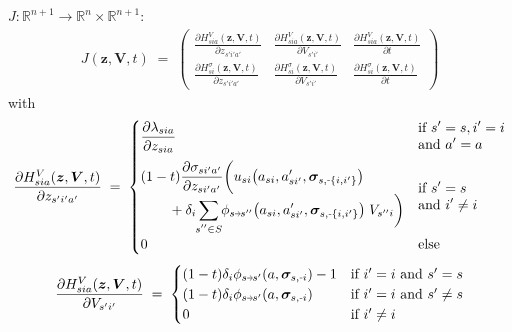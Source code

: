 \documentclass[11pt,fleqn]{article}
\newcommand{\R}{\mathbb{R}}
\newcommand{\bsigma}{\bm{\sigma}}
\newcommand{\bV}{\bm{V}}
\newcommand{\bz}{\bm{z}}
\newcommand{\shortminus}{{\text{\scalebox{0.4}[1.0]{\(-\)}}}}
\newcommand{\minusi}{\shortminus i}
\newcommand{\shortrightarrow}{\parbox{4pt}{\tikz{\draw[->](0,0)--(4pt,0);}}}
\newcommand{\phiss}{\phi_{s\shortrightarrow s'}}
\begin{document}
$J: \R^{n+1} \rightarrow \R^n \times \R^{n+1}$:
\begin{align*}
	J(\bz,\bV,t) \;=\; 
	\begin{pmatrix}
		\frac{ \partial H^V_{sia}(\bz,\bV,t) }{ \partial z_{s'i'a'} } 
		& \frac{ \partial H^V_{sia}(\bz,\bV,t) }{ \partial V_{s'i'} } 
		& \frac{ \partial H^V_{sia}(\bz,\bV,t) }{ \partial t } \\[1em] 
		\frac{ \partial H^\sigma_{si}(\bz,\bV,t) }{ \partial z_{s'i'a'} } 
		& \frac{ \partial H^\sigma_{si}(\bz,\bV,t) }{ \partial V_{s'i'} } 
		& \frac{ \partial H^\sigma_{si}(\bz,\bV,t) }{ \partial t }
	\end{pmatrix} 
\end{align*}
with
\begin{align*}
	\frac{ \partial H^V_{sia}(\bz,\bV,t) }{ \partial z_{s'i'a'} } \;=\; 
	\begin{cases}
		\begin{aligned}
			& \frac{\partial \lambda_{sia}}{\partial z_{sia}}
		\end{aligned} & 
		\begin{aligned}
			& \text{if } s'=s, i'=i \\ &\text{and } a'=a
		\end{aligned} \\[1em]
		\begin{aligned}
			& (1-t) \frac{\partial \sigma_{si'a'}}{\partial z_{si'a'}} \biggl( u_{si}\bigl(a_{si},a_{si'}',\bsigma_{s,\shortminus\{i,i'\}}\bigr) \\
			& \qquad + \delta_i \sum\limits_{\mathclap{s''\in S}} \phi_{s\shortrightarrow s''}\bigl(a_{si},a_{si'}',\bsigma_{s,\shortminus\{i,i'\}}\bigr) \; V_{s''i} \biggr)
		\end{aligned} & 
		\begin{aligned}
			& \text{if } s'=s \\ &\text{and } i'\neq i 
		\end{aligned} \\[1em]
		0 & \text{else}
	\end{cases}
\end{align*}
\begin{align*}
	\frac{ \partial H^V_{sia}(\bz,\bV,t) }{ \partial V_{s'i'} } \;=\;
	\begin{cases}
		(1-t) \delta_i \phiss(a,\bsigma_{s,\minusi}) - 1 &\text{if } i'=i \text{ and } s'=s \\
		(1-t) \delta_i \phiss(a,\bsigma_{s,\minusi}) &\text{if } i'=i \text{ and } s'\neq s \\
		0 &\text{if } i'\neq i
	\end{cases}
\end{align*}
\end{document}
